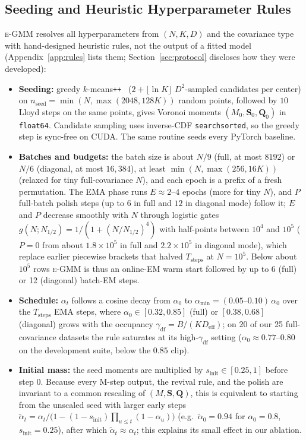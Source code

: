 \documentclass[10pt]{article} %
\newcommand{\egmm}{\textsc{e-GMM}}
\begin{document}
\subsection{Seeding and Heuristic Hyperparameter Rules}
\label{sec:scaling}

\egmm{} resolves all hyperparameters from $(N, K, D)$ and the covariance type with hand-designed heuristic rules, not the output of a fitted model (Appendix~\ref{app:rules} lists them; Section~\ref{sec:protocol} discloses how they were developed):
\begin{itemize}[leftmargin=*,nosep]
  \item \textbf{Seeding:} greedy $k$-means\texttt{++}~\citep{arthur2007kmeanspp,grunau2023greedy} ($2 + \lfloor \ln K \rfloor$ $D^2$-sampled candidates per center) on $n_{\mathrm{seed}} = \min(N, \max(2048, 128K))$ random points, followed by $10$ Lloyd steps on the same points, gives Voronoi moments $(M_0, \mathbf{S}_0, \mathbf{Q}_0)$ in \texttt{float64}. Candidate sampling uses inverse-CDF \texttt{searchsorted}, so the greedy step is sync-free on CUDA. The same routine seeds every PyTorch baseline.
  \item \textbf{Batches and budgets:} the batch size is about $N/9$ (full, at most $8192$) or $N/6$ (diagonal, at most $16{,}384$), at least $\min(N, \max(256, 16K))$ (relaxed for tiny full-covariance $N$), and each epoch is a prefix of a fresh permutation. The EMA phase runs $E \approx 2$--$4$ epochs (more for tiny $N$), and $P$ full-batch polish steps (up to $6$ in full and $12$ in diagonal mode) follow it; $E$ and $P$ decrease smoothly with $N$ through logistic gates $g(N; N_{1/2}) = 1/(1 + (N/N_{1/2})^4)$ with half-points between $10^4$ and $10^5$ ($P = 0$ from about $1.8 \times 10^5$ in full and $2.2 \times 10^5$ in diagonal mode), which replace earlier piecewise brackets that halved $T_{\mathrm{steps}}$ at $N = 10^5$. Below about $10^5$ rows \egmm{} is thus an online-EM warm start followed by up to 6 (full) or 12 (diagonal) batch-EM steps.
  \item \textbf{Schedule:} $\alpha_t$ follows a cosine decay from $\alpha_0$ to $\alpha_{\min} = (0.05\text{--}0.10)\,\alpha_0$ over the $T_{\mathrm{steps}}$ EMA steps, where $\alpha_0 \in [0.32, 0.85]$ (full) or $[0.38, 0.68]$ (diagonal) grows with the occupancy $\gamma_{\mathrm{df}} = B/(K D_{\mathrm{eff}})$; on 20 of our 25 full-covariance datasets the rule saturates at its high-$\gamma_{\mathrm{df}}$ setting ($\alpha_0 \approx 0.77$--$0.80$ on the development suite, below the $0.85$ clip).
  \item \textbf{Initial mass:} the seed moments are multiplied by $s_{\mathrm{init}} \in [0.25, 1]$ before step 0. Because every M-step output, the revival rule, and the polish are invariant to a common rescaling of $(M, \mathbf{S}, \mathbf{Q})$, this is equivalent to starting from the unscaled seed with larger early steps $\tilde{\alpha}_t = \alpha_t / \bigl(1 - (1 - s_{\mathrm{init}})\prod_{u \le t}(1 - \alpha_u)\bigr)$ (e.g.\ $\tilde{\alpha}_0 = 0.94$ for $\alpha_0 = 0.8$, $s_{\mathrm{init}} = 0.25$), after which $\tilde{\alpha}_t \approx \alpha_t$; this explains its small effect in our ablation.
\end{itemize}
\end{document}
